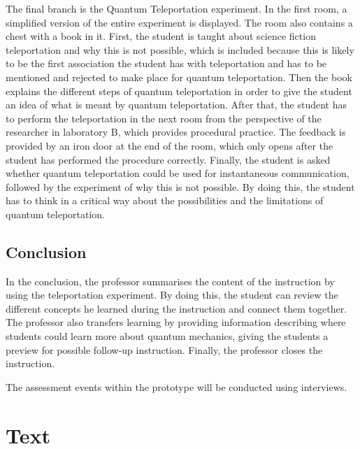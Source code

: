 \documentclass[11pt,twoside]{report} %
\begin{document}
The final branch is the Quantum Teleportation experiment. In the first room, a simplified version of the entire experiment is displayed. The room also contains a chest with a book in it. First, the student is taught about science fiction teleportation and why this is not possible, which is included because this is likely to be the first association the student has with teleportation and has to be mentioned and rejected to make place for quantum teleportation. Then the book explains the different steps of quantum teleportation in order to give the student an idea of what is meant by quantum teleportation. After that, the student has to perform the teleportation in the next room from the perspective of the researcher in laboratory B, which provides procedural practice. The feedback is provided by an iron door at the end of the room, which only opens after the student has performed the procedure correctly. Finally, the student is asked whether quantum teleportation could be used for instantaneous communication, followed by the experiment of why this is not possible. By doing this, the student has to think in a critical way about the possibilities and the limitations of quantum teleportation.

\subsection{Conclusion}

In the conclusion, the professor summarises the content of the instruction by using the teleportation experiment. By doing this, the student can review the different concepts he learned during the instruction and connect them together. The professor also transfers learning by providing information describing where students could learn more about quantum mechanics, giving the students a preview for possible follow-up instruction. Finally, the professor closes the instruction.

The assessment events within the prototype will be conducted using interviews.

\section{Text}
\label{sec:devtext}
\end{document}
